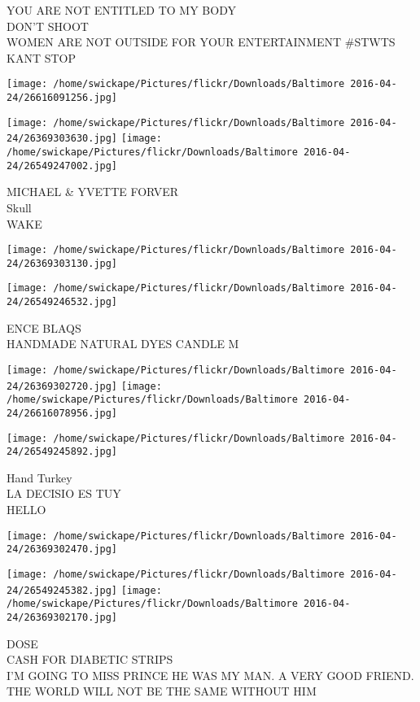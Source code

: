\documentclass[10pt,letterpaper]{article}
\begin{document}
YOU ARE NOT ENTITLED TO MY BODY\\
DON'T SHOOT\\
WOMEN ARE NOT OUTSIDE FOR YOUR ENTERTAINMENT \#STWTS\\
KANT STOP
\pagebreak

\texttt{[image: /home/swickape/Pictures/flickr/Downloads/Baltimore 2016-04-24/26616091256.jpg]}

\vspace{0.25in}
\texttt{[image: /home/swickape/Pictures/flickr/Downloads/Baltimore 2016-04-24/26369303630.jpg]}
\texttt{[image: /home/swickape/Pictures/flickr/Downloads/Baltimore 2016-04-24/26549247002.jpg]}

MICHAEL \& YVETTE FORVER\\
Skull\\
WAKE
\pagebreak

\texttt{[image: /home/swickape/Pictures/flickr/Downloads/Baltimore 2016-04-24/26369303130.jpg]}

\vspace{0.25in}
\texttt{[image: /home/swickape/Pictures/flickr/Downloads/Baltimore 2016-04-24/26549246532.jpg]}

ENCE BLAQS\\
HANDMADE NATURAL DYES CANDLE M
\pagebreak

\texttt{[image: /home/swickape/Pictures/flickr/Downloads/Baltimore 2016-04-24/26369302720.jpg]}
\texttt{[image: /home/swickape/Pictures/flickr/Downloads/Baltimore 2016-04-24/26616078956.jpg]}

\texttt{[image: /home/swickape/Pictures/flickr/Downloads/Baltimore 2016-04-24/26549245892.jpg]}

Hand Turkey\\
LA DECISIO ES TUY\\
HELLO
\pagebreak

\texttt{[image: /home/swickape/Pictures/flickr/Downloads/Baltimore 2016-04-24/26369302470.jpg]}

\vspace{0.25in}
\texttt{[image: /home/swickape/Pictures/flickr/Downloads/Baltimore 2016-04-24/26549245382.jpg]}
\texttt{[image: /home/swickape/Pictures/flickr/Downloads/Baltimore 2016-04-24/26369302170.jpg]}

DOSE\\
CASH FOR DIABETIC STRIPS\\
I'M GOING TO MISS PRINCE HE WAS MY MAN.  A VERY GOOD FRIEND.  THE WORLD WILL NOT BE THE SAME WITHOUT HIM
\pagebreak
\end{document}
